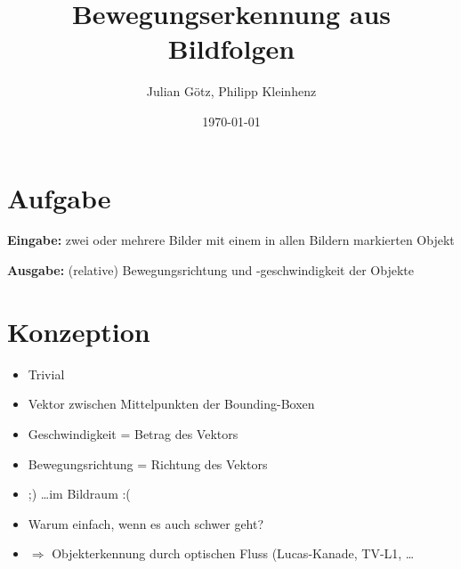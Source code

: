 \documentclass[10pt]{beamer}
\title{Bewegungserkennung aus Bildfolgen}
\subtitle{}
\date{\myformat\today}
\author{Julian G{\"o}tz, Philipp Kleinhenz}
\institute{Hochschule f{\"u}r Technik, Wirtschaft und Kultur Leipzig}
\begin{document}
\maketitle
{}
\def\code#1{\texttt{#1}}


\section{Aufgabe}
\begin{frame}{\secname}

\textbf{Eingabe: }zwei oder mehrere Bilder mit einem in allen Bildern markierten Objekt

\textbf{Ausgabe: }(relative) Bewegungsrichtung und -geschwindigkeit der Objekte

\end{frame}

\section{Konzeption}
\begin{frame}{\secname}

\begin{itemize}
	\item Trivial
	\item Vektor zwischen Mittelpunkten der Bounding-Boxen
	\item Geschwindigkeit = Betrag des Vektors
	\item Bewegungsrichtung = Richtung des Vektors
	\item ;) \dots im Bildraum :(
\end{itemize}

\begin{itemize} 
	\item Warum einfach, wenn es auch schwer geht?
	\item $\Rightarrow$ Objekterkennung durch optischen Fluss (Lucas-Kanade, TV-L1, \dots
\end{itemize}

\end{frame}
\end{document}
